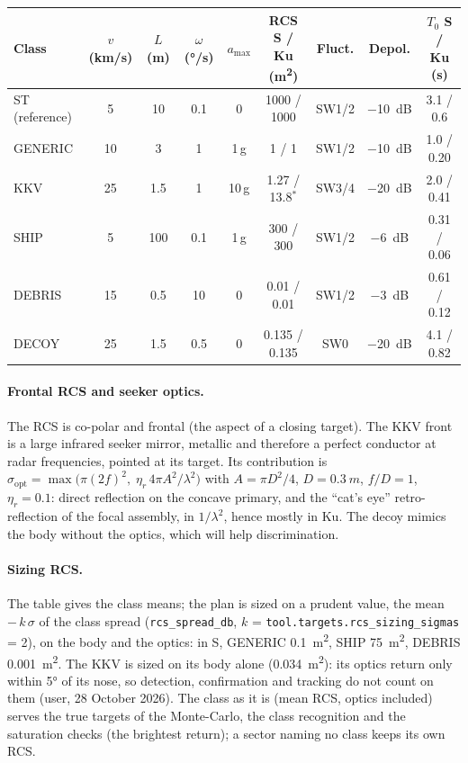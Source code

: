 \documentclass[11pt,a4paper]{article}
\newcommand{\code}[1]{\texttt{\small #1}}
\begin{document}
\begin{center}
{\small\setlength{\tabcolsep}{4pt}\begin{tabular}{@{}lcccccccc@{}}
\toprule
Class & $v$ (km/s) & $L$ (m) & $\omega$ (\si{\degree/s}) & $a_{\max}$ & RCS S / Ku (\si{m^2}) & Fluct. & Depol. & $T_0$ S / Ku (s)\\
\midrule
ST (reference) & 5 & 10 & 0.1 & 0 & \num{1000} / \num{1000} & SW1/2 & \SI{-10}{dB} & 3.1 / 0.6\\
GENERIC & 10 & 3 & 1 & 1\,g & 1 / 1 & SW1/2 & \SI{-10}{dB} & 1.0 / 0.20\\
KKV & 25 & 1.5 & 1 & 10\,g & 1.27 / 13.8$^\ast$ & SW3/4 & \SI{-20}{dB} & 2.0 / 0.41\\
SHIP & 5 & 100 & 0.1 & 1\,g & 300 / 300 & SW1/2 & \SI{-6}{dB} & 0.31 / 0.06\\
DEBRIS & 15 & 0.5 & 10 & 0 & 0.01 / 0.01 & SW1/2 & \SI{-3}{dB} & 0.61 / 0.12\\
DECOY & 25 & 1.5 & 0.5 & 0 & 0.135 / 0.135 & SW0 & \SI{-20}{dB} & 4.1 / 0.82\\
\bottomrule
\end{tabular}}

\end{center}

\paragraph{Frontal RCS and seeker optics.} The RCS is co-polar and frontal (the aspect of a closing target). The KKV
front is a large infrared seeker mirror, metallic and therefore a perfect conductor at radar frequencies, pointed at
its target. Its contribution is
$\sigma_{\mathrm{opt}} = \max\bigl(\pi(2f)^2,\;\eta_r\,4\pi A^2/\lambda^2\bigr)$ with $A = \pi D^2/4$, $D = \SI{0.3}{m}$,
$f/D = 1$, $\eta_r = 0.1$: direct reflection on the concave primary, and the ``cat's eye'' retro-reflection of the
focal assembly, in $1/\lambda^2$, hence mostly in Ku. The decoy mimics the body without the optics, which will help
discrimination.

\paragraph{Sizing RCS.} The table gives the class means; the plan is sized on a prudent value, the mean
$-\,k\,\sigma$ of the class spread (\code{rcs\_spread\_db}, $k$ = \code{tool.targets.rcs\_sizing\_sigmas} = 2), on
the body and the optics: in S, GENERIC \SI{0.1}{m^2}, SHIP \SI{75}{m^2}, DEBRIS \SI{0.001}{m^2}. The KKV is sized on
its body alone (\SI{0.034}{m^2}): its optics return only within \ang{5} of its nose, so detection, confirmation and
tracking do not count on them (user, 28 October 2026). The class as it is (mean RCS, optics included) serves the
true targets of the Monte-Carlo, the class recognition and the saturation checks (the brightest return); a sector
naming no class keeps its own RCS.
\end{document}
